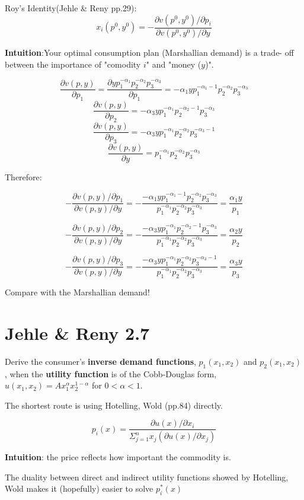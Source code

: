 \documentclass{article}
\begin{document}
\begin{mdframed}[backgroundcolor=blue!20,linecolor=white]
Roy's Identity(Jehle \& Reny pp.29): $$x_i(p^0,y^0) = - \frac{\partial v(p^0,y^0) / \partial p_i}{\partial v(p^0,y^0) / \partial y}$$

\textbf{Intuition}:Your optimal consumption plan (Marshallian demand) is a trade- off between the importance of "comodity $i$" and "money ($y$)".

\end{mdframed}

$$\frac{\partial v(p,y)} {\partial p_1} = \frac{\partial yp_1^{-\alpha_1}p_2^{-\alpha_2}p_3^{-\alpha_3}}{\partial p_1} =  -\alpha_1 yp_1^{-\alpha_1 -1}p_2^{-\alpha_2}p_3^{-\alpha_3}$$
$$\frac{\partial v(p,y)} {\partial p_2} =  -\alpha_3 yp_1^{-\alpha_1}p_2^{-\alpha_2-1}p_3^{-\alpha_3}$$
$$\frac{\partial v(p,y)} {\partial p_3} =  -\alpha_3 yp_1^{-\alpha_1}p_2^{-\alpha_2}p_3^{-\alpha_3-1}$$
$$\frac{\partial v(p,y)} {\partial y} = p_1^{-\alpha_1}p_2^{-\alpha_2}p_3^{-\alpha_3}$$

Therefore:

$$-\frac{\partial v(p,y) / \partial p_1}{\partial v(p,y) / \partial y} =-\frac{-\alpha_1 yp_1^{-\alpha_1 -1}p_2^{-\alpha_2}p_3^{-\alpha_3}}{p_1^{-\alpha_1}p_2^{-\alpha_2}p_3^{-\alpha_3}} = \frac{\alpha_1 y}{p_1}$$

$$-\frac{\partial v(p,y) / \partial p_2}{\partial v(p,y) / \partial y} =-\frac{-\alpha_3 yp_1^{-\alpha_1}p_2^{-\alpha_2-1}p_3^{-\alpha_3}}{p_1^{-\alpha_1}p_2^{-\alpha_2}p_3^{-\alpha_3}} = \frac{\alpha_2 y}{p_2}$$

$$-\frac{\partial v(p,y) / \partial p_3}{\partial v(p,y) / \partial y} =-\frac{ -\alpha_3 yp_1^{-\alpha_1}p_2^{-\alpha_2}p_3^{-\alpha_3-1}}{p_1^{-\alpha_1}p_2^{-\alpha_2}p_3^{-\alpha_3}} = \frac{\alpha_3 y}{p_3}$$

Compare with the Marshallian demand!

\section{Jehle \& Reny 2.7}
Derive the consumer's \textbf{inverse demand functions}, $p_1(x_1, x_2)$ and $p_2(x_1, x_2)$, when the \textbf{utility function} is of the Cobb-Douglas form, $u(x_1, x_2) = Ax_1^{\alpha}x_2^{1-\alpha}$ for $0 < \alpha < 1$.

\begin{mdframed}[backgroundcolor=blue!20,linecolor=white]
The shortest route is using Hotelling, Wold (pp.84) directly.

$$p_i(x) = \frac{\partial u(x) / \partial x_i}{\Sigma^{n}_{j=1} x_j( \partial u(x) / \partial x_j)}$$

\textbf{Intuition}: the price reflects how important the commodity is.

\vspace{3mm}


The duality between direct and indirect utility functions showed by Hotelling, Wold makes it (hopefully) easier to solve $p_i^*(x)$
\end{mdframed}
\end{document}
